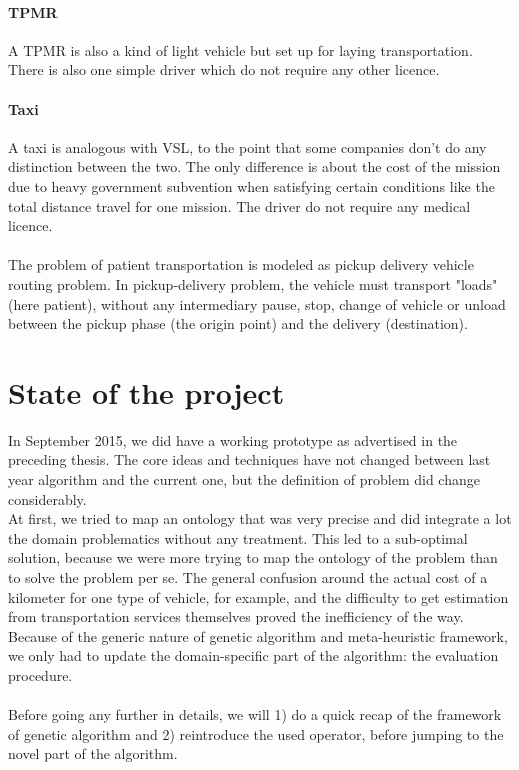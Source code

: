 \documentclass[12pt]{memoir}
\begin{document}
  \paragraph{TPMR} %
\label{par:TPMR}
A TPMR is also a kind of light vehicle but set up for laying transportation. There is
also one simple driver which do not require any other licence. 

  \paragraph{Taxi} %
\label{par:Taxi}
A taxi is analogous with VSL, to the point that some companies don't do any
distinction between the two. The only difference is about the cost of the mission
due to heavy government subvention when satisfying certain conditions like the total
distance travel for one mission. The driver do not require any medical licence.\\
\\
The problem of patient transportation is modeled as pickup delivery vehicle routing
problem. In pickup-delivery problem, the vehicle must transport "loads" (here
patient), without any intermediary pause, stop, change of vehicle or unload
between the pickup phase (the origin point) and the delivery (destination).

\section{State of the project}
In September 2015, we did have a working prototype as advertised in the preceding
thesis. The core ideas and techniques have not changed between last year algorithm
and the current one, but the definition of problem did change considerably. \\
At first, we tried to map an ontology that was very precise and did integrate a lot
the domain problematics without any treatment. This led to a sub-optimal solution,
because we were more trying to map the ontology of the problem than to solve the
problem per se. The general confusion around the actual cost of a kilometer for
one type of vehicle, for example, and the difficulty to get estimation from transportation services
themselves proved the inefficiency of the way.\\
Because of the generic nature of genetic algorithm and meta-heuristic framework, we only
had to update the domain-specific part of the algorithm: the evaluation procedure.\\
\\
Before going any further in details, we will 1) do a quick recap of the framework
of genetic algorithm and 2) reintroduce the used operator, before jumping to the
novel part of the algorithm.
\end{document}
